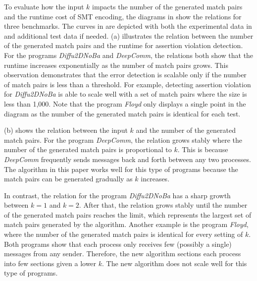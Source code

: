 To evaluate how the input $k$ impacts the number of the generated match pairs and the runtime cost of SMT encoding, the diagrams in  show the relations for three benchmarks. The curves in  are depicted with both the experimental data in  and additional test data if needed.  (a) illustrates the relation between the number of the generated match pairs and the runtime for assertion violation detection. For the programs \textit{Diffu2DNoBa} and \textit{DeepComm}, the relations both show that the runtime increases exponentially as the number of match pairs grows. This observation demonstrates that the error detection is scalable only if the number of match pairs is less than a threshold. For example, detecting assertion violation for \textit{Diffu2DNoBa} is able to scale well with a set of match pairs where the size is less than 1,000.
Note that the program \textit{Floyd} only displays a single point in the diagram as the number of the generated match pairs is identical for each test.


 (b) shows the relation between the input $k$ and the number of the generated match pairs. For the program \textit{DeepComm}, the relation grows stably where the number of the generated match pairs is proportional to $k$. 
This is because \textit{DeepComm} frequently sends messages back and forth between any two processes. The algorithm in this paper works well for this type of programs because the match pairs can be generated gradually as $k$ increases.

In contrast, the relation for the program \textit{Diffu2DNoBa} has a sharp growth between $k=1$ and $k=2$. After that, the relation grows stably until the number of the generated match pairs reaches the limit, which represents the largest set of match pairs generated by the algorithm. 
Another example is the program \textit{Floyd}, where the number of the generated match pairs is identical for every setting of $k$. 
Both programs show that each process only receives few (possibly a single) messages from any sender.
Therefore, the new algorithm sections each process into few sections given a lower $k$. 
The new algorithm does not scale well for this type of programs.


